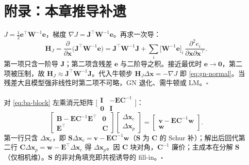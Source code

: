 \section*{附录：本章推导补遗}
\label{sec:nlopt-appendix}

\begin{derivation}
$J=\tfrac12\mathbf{e}^\top\mathbf{W}^{-1}\mathbf{e}$，梯度 $\nabla J=\mathbf{J}^\top\mathbf{W}^{-1}\mathbf{e}$。再求一次导：
\[
  \mathbf{H}_J=\frac{\partial}{\partial\mathbf{x}}\big(\mathbf{J}^\top\mathbf{W}^{-1}\mathbf{e}\big)
  =\mathbf{J}^\top\mathbf{W}^{-1}\mathbf{J}+\sum_i\big[\mathbf{W}^{-1}\mathbf{e}\big]_i\,\frac{\partial^2 e_i}{\partial\mathbf{x}\partial\mathbf{x}^\top}.
\]
第一项只含一阶导 $\mathbf{J}$；第二项含残差 $\mathbf{e}$ 与二阶导之积。接近最优时 $\mathbf{e}\to\mathbf{0}$，第二项被压制，故 $\mathbf{H}_J\approx\mathbf{J}^\top\mathbf{W}^{-1}\mathbf{J}$。代入牛顿步 $\mathbf{H}_J\Delta\mathbf{x}=-\nabla J$ 即 \cref{eq:gn-normal}。当残差大且模型强非线性时第二项不可略，GN 退化、需牛顿或 LM。\hfill$\square$
\end{derivation}

\begin{derivation}
对 \cref{eq:ba-block} 左乘消元矩阵 $\big[\begin{smallmatrix}\mathbf{I}&-\mathbf{E}\mathbf{C}^{-1}\\\mathbf{0}&\mathbf{I}\end{smallmatrix}\big]$：
\[
  \begin{bmatrix}\mathbf{B}-\mathbf{E}\mathbf{C}^{-1}\mathbf{E}^\top&\mathbf{0}\\\mathbf{E}^\top&\mathbf{C}\end{bmatrix}
  \begin{bmatrix}\Delta\mathbf{x}_c\\\Delta\mathbf{x}_p\end{bmatrix}
  =\begin{bmatrix}\mathbf{v}-\mathbf{E}\mathbf{C}^{-1}\mathbf{w}\\\mathbf{w}\end{bmatrix}.
\]
第一行只含 $\Delta\mathbf{x}_c$，即 $\mathbf{S}\Delta\mathbf{x}_c=\mathbf{v}-\mathbf{E}\mathbf{C}^{-1}\mathbf{w}$（$\mathbf{S}$ 为 $\mathbf{C}$ 的 Schur 补）；解出后回代第二行 $\mathbf{C}\Delta\mathbf{x}_p=\mathbf{w}-\mathbf{E}^\top\Delta\mathbf{x}_c$ 得 $\Delta\mathbf{x}_p$。因 $\mathbf{C}$ 块对角，$\mathbf{C}^{-1}$ 廉价；主成本在分解 $\mathbf{S}$（仅相机维）。$\mathbf{S}$ 的非对角填充即共视诱导的 fill-in。\hfill$\square$
\end{derivation}

